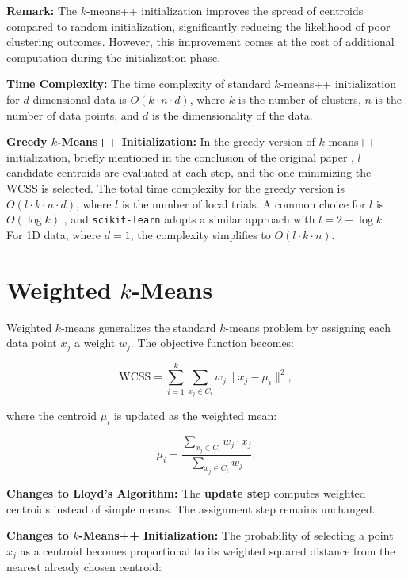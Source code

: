 \noindent \textbf{Remark:}  
The $k$-means++ initialization improves the spread of centroids compared to random initialization, significantly reducing the likelihood of poor clustering outcomes. However, this improvement comes at the cost of additional computation during the initialization phase.

\noindent \textbf{Time Complexity:}  
The time complexity of standard $k$-means++ initialization for \(d\)-dimensional data is \(O(k \cdot n \cdot d)\), where \(k\) is the number of clusters, \(n\) is the number of data points, and \(d\) is the dimensionality of the data.

\noindent \textbf{Greedy $k$-Means++ Initialization:}  
In the greedy version of $k$-means++ initialization, briefly mentioned in the conclusion of the original paper \cite{kmeansplusplus}, \(l\) candidate centroids are evaluated at each step, and the one minimizing the WCSS is selected. The total time complexity for the greedy version is \(O(l \cdot k \cdot n \cdot d)\), where \(l\) is the number of local trials. A common choice for \(l\) is \(O(\log k)\) \cite{localtrials1, localtrials2}, and \texttt{scikit-learn} adopts a similar approach with \(l = 2 + \log k\) \cite{sklearn}. For 1D data, where \(d = 1\), the complexity simplifies to \(O(l \cdot k \cdot n)\).

\section{Weighted $k$-Means}\label{sec:weightedkmeans}

Weighted $k$-means generalizes the standard $k$-means problem by assigning each data point \(x_j\) a weight \(w_j\). The objective function becomes:

\[
\text{WCSS} = \sum_{i=1}^k \sum_{x_j \in C_i} w_j \|x_j - \mu_i\|^2,
\]

where the centroid \(\mu_i\) is updated as the weighted mean:

\[
\mu_i = \frac{\sum_{x_j \in C_i} w_j \cdot x_j}{\sum_{x_j \in C_i} w_j}.
\]

\noindent \textbf{Changes to Lloyd’s Algorithm:}  
The \textbf{update step} computes weighted centroids instead of simple means. The assignment step remains unchanged.

\noindent \textbf{Changes to $k$-Means++ Initialization:}  
The probability of selecting a point \(x_j\) as a centroid becomes proportional to its weighted squared distance from the nearest already chosen centroid:

